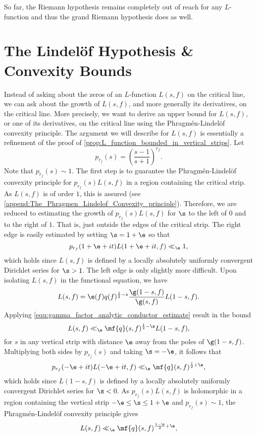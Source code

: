     So far, the Riemann hypothesis remains completely out of reach for any $L$-function and thus the grand Riemann hypothesis does as well.
  \section{The Lindel\"of Hypothesis \& Convexity Bounds}
    Instead of asking about the zeros of an $L$-function $L(s,f)$ on the critical line, we can ask about the growth of $L(s,f)$, and more generally its derivatives, on the critical line. More precisely, we want to derive an upper bound for $L(s,f)$, or one of its derivatives, on the critical line using the Phragm\'en-Lindel\"of convexity principle. The argument we will describe for $L(s,f)$ is essentially a refinement of the proof of \cref{prop:L_function_bounded_in_vertical_strips}. Let
    \[
      p_{r_{f}}(s) = \left(\frac{s-1}{s+1}\right)^{r_{f}}.
    \]
    Note that $p_{r_{f}}(s) \sim 1$. The first step is to guarantee the Phragm\'en-Lindel\"of convexity principle for $p_{r_{f}}(s)L(s,f)$ in a region containing the critical strip. As $L(s,f)$ is of order $1$, this is assured (see \cref{append:The_Phragmen_Lindelof_Convexity_principle}). Therefore, we are reduced to estimating the growth of $p_{r_{f}}(s)L(s,f)$ for $\s$ to the left of $0$ and to the right of $1$. That is, just outside the edges of the critical strip. The right edge is easily estimated by setting $\s = 1+\e$ so that
    \[
      p_{r_{f}}(1+\e+it)L(1+\e+it,f) \ll_{\e} 1,
    \]
    which holds since $L(s,f)$ is defined by a locally absolutely uniformly convergent Dirichlet series for $\s > 1$. The left edge is only slightly more difficult. Upon isolating $L(s,f)$ in the functional equation, we have
    \[
      L(s,f) = \e(f)q(f)^{\frac{1}{2}-s}\frac{\g(1-s,f)}{\g(s,f)}L(1-s,f).
    \]
    Applying \cref{equ:gamma_factor_analytic_conductor_estimate} result in the bound
    \[
      L(s,f) \ll_{\e} \mf{q}(s,f)^{\frac{1}{2}-\s}L(1-s,f),
    \]
    for $s$ in any vertical strip with distance $\e$ away from the poles of $\g(1-s,f)$. Multiplying both sides by $p_{r_{f}}(s)$ and taking $\s = -\e$, it follows that
    \[
      p_{r_{f}}(-\e+it)L(-\e+it,f) \ll_{\e} \mf{q}(s,f)^{\frac{1}{2}+\e},
    \]
    which holds since $L(1-s,f)$ is defined by a locally absolutely uniformly convergent Dirichlet series for $\s < 0$. As $p_{r_{f}}(s)L(s,f)$ is holomorphic in a region containing the vertical strip $-\e \le \s \le 1+\e$ and $p_{r_{f}}(s) \sim 1$, the Phragm\'en-Lindel\"of convexity principle gives
    \begin{equation}\label{equ:convexity_bound_for_L_function_in_critial_strip}
      L(s,f) \ll_{\e} \mf{q}(s,f)^{\frac{1-\s}{2}+\e},
    \end{equation}

